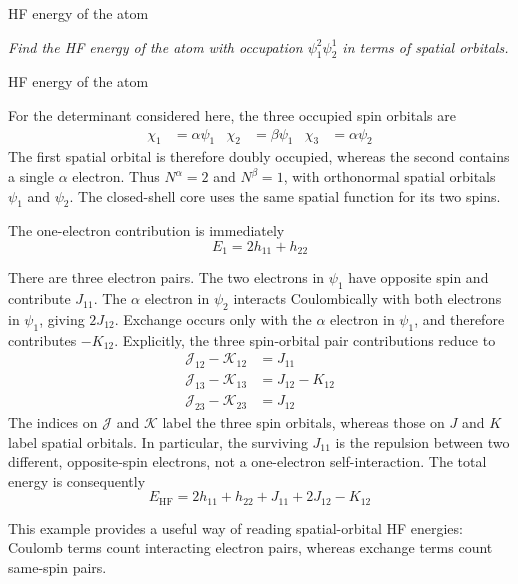 \documentclass[11pt,a4paper,titlepage]{article}
\numberwithin{equation}{section}
\newcommand{\cJ}{\mathcal{J}}
\newcommand{\cK}{\mathcal{K}}
\newcommand{\violet}[1]{\textcolor{hfViolet}{#1}}
\begin{document}
\begin{hfexercise}{HF energy of the  atom}

\violet{\textit{Find the HF energy of the \ce{Li} atom with occupation
$\psi_1^2\psi_2^1$ in terms of spatial orbitals.}}

\end{hfexercise}
\begin{hfsolution}{HF energy of the  atom}

For the determinant considered here, the three occupied spin orbitals are
\begin{align}
  \chi_1&=\alpha\psi_1
  &
  \chi_2&=\beta\psi_1
  &
  \chi_3&=\alpha\psi_2
\end{align}
The first spatial orbital is therefore doubly occupied, whereas the second
contains a single $\alpha$ electron. Thus $N^\alpha=2$ and
$N^\beta=1$, with orthonormal spatial orbitals $\psi_1$ and $\psi_2$.
The closed-shell core uses the same spatial function for its two spins.

The one-electron contribution is immediately
\begin{equation}
  E_1
  =
  2h_{11}+h_{22}
\end{equation}

There are three electron pairs. The two electrons in $\psi_1$ have opposite
spin and contribute
  $J_{11}$.
The $\alpha$ electron in $\psi_2$ interacts Coulombically with both
electrons in $\psi_1$, giving
  $2J_{12}$.
Exchange occurs only with the $\alpha$ electron in $\psi_1$, and therefore
contributes
  $-K_{12}$.
Explicitly, the three spin-orbital pair contributions reduce to
\begin{align}
  \cJ_{12}-\cK_{12}&=J_{11}\\
  \cJ_{13}-\cK_{13}&=J_{12}-K_{12}\\
  \cJ_{23}-\cK_{23}&=J_{12}
\end{align}
The indices on $\cJ$ and $\cK$ label the three spin orbitals, whereas
those on $J$ and $K$ label spatial orbitals. In particular, the surviving
$J_{11}$ is the repulsion between two different, opposite-spin electrons,
not a one-electron self-interaction.
The total energy is consequently
\begin{equation}
  E_\text{HF}
  =
  2h_{11}
  +
  h_{22}
  +
  J_{11}
  +
  2J_{12}
  -
  K_{12}
\end{equation}

This example provides a useful way of reading spatial-orbital HF energies:
Coulomb terms count interacting electron pairs, whereas exchange terms
count same-spin pairs.


\end{hfsolution}
\end{document}
